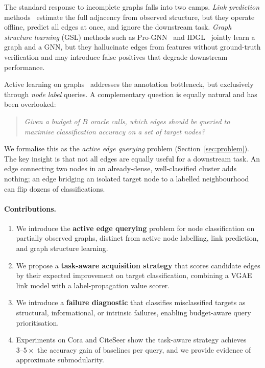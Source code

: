 \documentclass{article}
\begin{document}
The standard response to incomplete graphs falls into two camps.
\emph{Link prediction} methods~\cite{zhang2018link,kipf2016variational} estimate the full adjacency from observed structure, but they operate offline, predict all edges at once, and ignore the downstream task.
\emph{Graph structure learning} (GSL) methods such as Pro-GNN~\cite{jin2020graph} and IDGL~\cite{chen2020iterative} jointly learn a graph and a GNN, but they hallucinate edges from features without ground-truth verification and may introduce false positives that degrade downstream performance.

Active learning on graphs~\cite{cai2017active,gao2018active,wu2019active} addresses the annotation bottleneck, but exclusively through \emph{node label} queries.
A complementary question is equally natural and has been overlooked:
\begin{quote}
\emph{Given a budget of $B$ oracle calls, which edges should be queried to maximise classification accuracy on a set of target nodes?}
\end{quote}

We formalise this as the \emph{active edge querying} problem (Section~\ref{sec:problem}).
The key insight is that not all edges are equally useful for a downstream task.
An edge connecting two nodes in an already-dense, well-classified cluster adds nothing; an edge bridging an isolated target node to a labelled neighbourhood can flip dozens of classifications.

\paragraph{Contributions.}
\begin{enumerate}
    \item We introduce the \textbf{active edge querying} problem for node classification on partially observed graphs, distinct from active node labelling, link prediction, and graph structure learning.
    \item We propose a \textbf{task-aware acquisition strategy} that scores candidate edges by their expected improvement on target classification, combining a VGAE link model with a label-propagation value scorer.
    \item We introduce a \textbf{failure diagnostic} that classifies misclassified targets as structural, informational, or intrinsic failures, enabling budget-aware query prioritisation.
    \item Experiments on Cora and CiteSeer show the task-aware strategy achieves $3\text{--}5\times$ the accuracy gain of baselines per query, and we provide evidence of approximate submodularity.
\end{enumerate}
\end{document}
